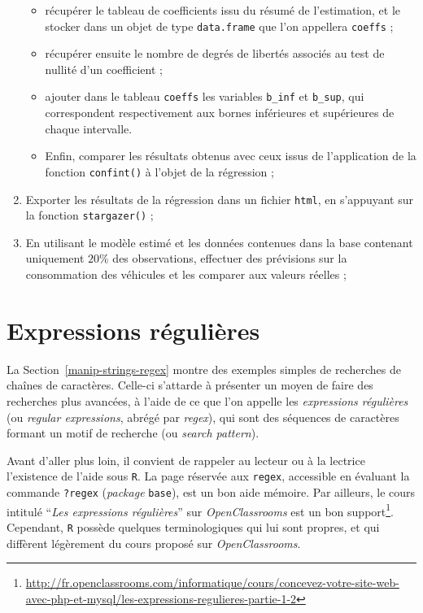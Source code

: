 \documentclass[
  11pt,
]{book}
\makeatletter
\providecommand{\tightlist}{%
  \setlength{\itemsep}{0pt}\setlength{\parskip}{0pt}}
\numberwithin{equation}{section}
\numberwithin{countremarque}{section}
\newenvironment{exframe}{%
 \def\at@end@of@exframe{}%
 \ifinner\ifhmode%
  \def\at@end@of@exframe{\end{minipage}}%
  \begin{minipage}{\columnwidth}%
 \fi\fi%
 \def\FrameCommand##1{\hskip\@totalleftmargin \hskip-\fboxsep
 \colorbox{shadecolorex}{##1}\hskip-\fboxsep
     \hskip-\linewidth \hskip-\@totalleftmargin \hskip\columnwidth}%
 \MakeFramed {\advance\hsize-\width
   \@totalleftmargin\z@ \linewidth\hsize
   \@setminipage}}%
 {\par\unskip\endMakeFramed%
 \at@end@of@exframe}
\makeatother
\begin{document}
\begin{exframe}
\begin{enumerate}
  \begin{itemize}
  \tightlist
  \item
    récupérer le tableau de coefficients issu du résumé de l'estimation, et le stocker dans un objet de type \texttt{data.frame} que l'on appellera \texttt{coeffs} ;
  \item
    récupérer ensuite le nombre de degrés de libertés associés au test de nullité d'un coefficient ;
  \item
    ajouter dans le tableau \texttt{coeffs} les variables \texttt{b\_inf} et \texttt{b\_sup}, qui correspondent respectivement aux bornes inférieures et supérieures de chaque intervalle.
  \item
    Enfin, comparer les résultats obtenus avec ceux issus de l'application de la fonction \texttt{confint()} à l'objet de la régression ;
  \end{itemize}
\item
  Exporter les résultats de la régression dans un fichier \texttt{html}, en s'appuyant sur la fonction \texttt{stargazer()} ;
\item
  En utilisant le modèle estimé et les données contenues dans la base contenant uniquement \(20\%\) des observations, effectuer des prévisions sur la consommation des véhicules et les comparer aux valeurs réelles ;
\end{enumerate}
\end{exframe}

\hypertarget{regex}{%
\chapter{Expressions régulières}\label{regex}}

La Section~\ref{manip-strings-regex} montre des exemples simples de recherches de chaînes de caractères. Celle-ci s'attarde à présenter un moyen de faire des recherches plus avancées, à l'aide de ce que l'on appelle les \emph{expressions régulières} (ou \emph{regular expressions}, abrégé par \emph{regex}), qui sont des séquences de caractères formant un motif de recherche (ou \emph{search pattern}).

Avant d'aller plus loin, il convient de rappeler au lecteur ou à la lectrice l'existence de l'aide sous \texttt{R}. La page réservée aux \texttt{regex}, accessible en évaluant la commande \texttt{?regex} (\emph{package} \texttt{base}), est un bon aide mémoire. Par ailleurs, le cours intitulé ``\emph{Les expressions régulières}'' sur \emph{OpenClassrooms} est un bon support\footnote{\url{http://fr.openclassrooms.com/informatique/cours/concevez-votre-site-web-avec-php-et-mysql/les-expressions-regulieres-partie-1-2}}. Cependant, \texttt{R} possède quelques terminologiques qui lui sont propres, et qui diffèrent légèrement du cours proposé sur \emph{OpenClassrooms}.
\end{document}

